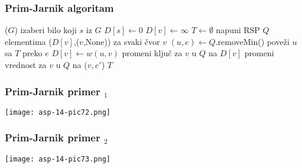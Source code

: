 \documentclass[compress,aspectratio=169]{beamer}
\begin{document}
\begin{frame}[fragile,shrink=2]
  \frametitle{Prim-Jarnik algoritam}
  \begin{algorithmic}
    \STATE {}($G$)
    \STATE izaberi bilo koji $s$ iz $G$
    \STATE $D[s] \leftarrow 0$
      \STATE $D[v] \leftarrow \infty$
    \ENDFOR
    \STATE $T \leftarrow \emptyset$
    \STATE napuni RSP $Q$ elementima ($D[v]$,($v$,None)) za svaki čvor $v$
      \STATE $(u,e) \leftarrow Q$.removeMin()
      \STATE poveži $u$ sa $T$ preko $e$
        \STATE {}
          \STATE $D[v] \leftarrow w(u,v)$
          \STATE promeni ključ za $v$ u $Q$ na $D[v]$
          \STATE promeni vrednost za $v$ u $Q$ na ($v,e'$)
        \ENDIF
      \ENDFOR
    \ENDWHILE
    \RETURN $T$
  \end{algorithmic}
\end{frame}

\begin{frame}[fragile]
  \frametitle{Prim-Jarnik primer $_1$}
  \begin{center}
    \texttt{[image: asp-14-pic72.png]}
  \end{center}
\end{frame}

\begin{frame}[fragile]
  \frametitle{Prim-Jarnik primer $_2$}
  \begin{center}
    \texttt{[image: asp-14-pic73.png]}
  \end{center}
\end{frame}
\end{document}
